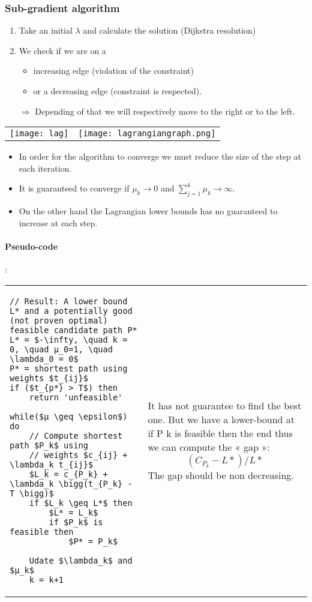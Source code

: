 \subsubsection{Sub-gradient algorithm}

\begin{enumerate}
    \item Take an initial $\lambda$ and calculate the solution (Dijkstra resolution)
    \item We check if we are on a 
        \begin{itemize}
            \item increasing edge (violation of the constraint) 
            \item or a decreasing edge (constraint is respected). 
        \end{itemize}

        $\Rightarrow$ Depending of that we will respectively move to
        the right or to the left.
\end{enumerate}

\begin{tabular}{m{9cm}m{9cm}}
    \texttt{[image: lag]}
    &
    \texttt{[image: lagrangiangraph.png]}
\end{tabular}


\begin{itemize}
    \item In order for the algorithm to converge we must reduce the size
        of the step at each iteration. 
    \item It is guaranteed to converge if $\mu_{k} \rightarrow 0$ and
        $\sum^{k}_{j=1} \mu_{k} \rightarrow \infty$.
    \item On the other hand the Lagrangian lower bounds has no
        guaranteed to increase at each step.
    \end{itemize}

\paragraph{Pseudo-code}:

\begin{tabular}{m{9cm}m{6cm}}
\begin{lstlisting}[mathescape]
// Result: A lower bound L* and a potentially good (not proven optimal) feasible candidate path P*
L* = $-\infty, \quad k = 0, \quad µ_0=1, \quad \lambda_0 = 0$
P* = shortest path using weights $t_{ij}$
if ($t_{p*} > T$) then
    return 'unfeasible'

while($µ \geq \epsilon$) do
    // Compute shortest path $P_k$ using 
    // weights $c_{ij} + \lambda_k t_{ij}$
    $L_k = c_{P_k} + \lambda_k \bigg(t_{P_k} - T \bigg)$
    if $L_k \geq L*$ then
        $L* = L_k$
        if $P_k$ is feasible then
            $P* = P_k$

    Udate $\lambda_k$ and $µ_k$
    k = k+1
\end{lstlisting}
&
It has not guarantee to find the best
one. But we have a lower-bound at
if P k is feasible then
the end thus we can compute the
« gap »: $$(C_{P_k} - L*)/L*$$
The gap should be non decreasing.
\end{tabular}

